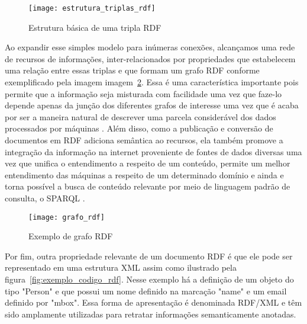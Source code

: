 \begin{figure}[!ht]
  \centering
  \texttt{[image: estrutura\_triplas\_rdf]} 
  \caption{Estrutura básica de uma tripla RDF}
  \label{fig:estrutura_triplas_rdf} 
\end{figure}

Ao expandir esse simples modelo para inúmeras conexões, alcançamos uma rede de recursos de informações, inter-relacionados por propriedades que estabelecem uma relação entre essas triplas e que formam um grafo RDF conforme exemplificado pela imagem imagem~\ref{fig:grafo_rdf}. Essa é uma característica importante pois permite que a informação seja misturada com facilidade uma vez que faze-lo depende apenas da junção dos diferentes grafos de interesse uma vez que é acaba por ser a maneira natural de descrever uma parcela considerável dos dados processados por máquinas \citep{Allemang2011}. Além disso, como a publicação e conversão de documentos em RDF adiciona semântica ao recursos, ela também promove a integração da informação na internet proveniente de fontes de dados diversas uma vez que unifica o entendimento a respeito de um conteúdo, permite um melhor entendimento das máquinas a respeito de um determinado domínio e ainda e torna possível a busca de conteúdo relevante por meio de linguagem padrão de consulta, o SPARQL \citep{Heath2008}.

\begin{figure}[!ht]
  \centering
  \texttt{[image: grafo\_rdf]} 
  \caption{Exemplo de grafo RDF}
  \label{fig:grafo_rdf} 
\end{figure}

Por fim, outra propriedade relevante de um documento RDF é que ele pode ser representado em uma estrutura XML assim como ilustrado pela figura~\ref{fig:exemplo_codigo_rdf}. Nesse exemplo há a definição de um objeto do tipo "Person" e que possui um nome definido na marcação "name" e um email definido por "mbox". Essa forma de apresentação é denominada RDF/XML e têm sido amplamente utilizadas para retratar informações semanticamente anotadas.


